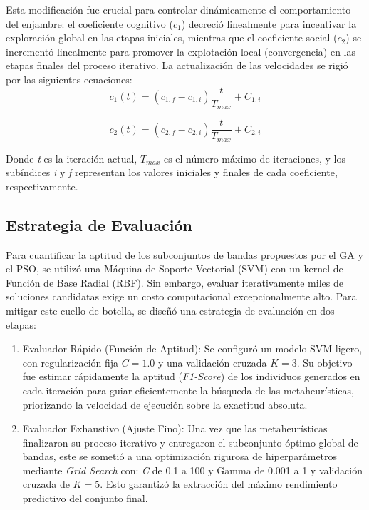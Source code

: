 Esta modificación fue crucial para controlar dinámicamente el comportamiento del enjambre: el coeficiente cognitivo ($c_1$) decreció linealmente para incentivar la exploración global en las etapas iniciales, mientras que el coeficiente social ($c_2$)  se incrementó linealmente para promover la explotación local (convergencia) en las etapas finales del proceso iterativo. La actualización de las velocidades se rigió por las siguientes ecuaciones:
\begin{equation}
    c_1(t)=(c_{1,f}-c_{1,i}) \frac{t}{T_{max}}+C_{1,i}
\end{equation}

\begin{equation}
    c_2(t)=(c_{2,f}-c_{2,i}) \frac{t}{T_{max}}+C_{2,i}
\end{equation}

Donde \textit{t} es la iteración actual, $T_{max}$ es el número máximo de iteraciones, y los subíndices \textit{i} y \textit{f} representan los valores iniciales y finales de cada coeficiente, respectivamente.

\subsection{Estrategia de Evaluación}
Para cuantificar la aptitud de los subconjuntos de bandas propuestos por el GA y el PSO, se utilizó una Máquina de Soporte Vectorial (SVM) con un kernel de Función de Base Radial (RBF). Sin embargo, evaluar iterativamente miles de soluciones candidatas exige un costo computacional excepcionalmente alto. Para mitigar este cuello de botella, se diseñó una estrategia de evaluación en dos etapas:
\begin{enumerate}
    \item Evaluador Rápido (Función de Aptitud): Se configuró un modelo SVM ligero, con regularización fija $C = 1.0$ y una validación cruzada $K = 3$. Su objetivo fue estimar rápidamente la aptitud (\textit{F1-Score}) de los individuos generados en cada iteración para guiar eficientemente la búsqueda de las metaheurísticas, priorizando la velocidad de ejecución sobre la exactitud absoluta.
    \item Evaluador Exhaustivo (Ajuste Fino): Una vez que las metaheurísticas finalizaron su proceso iterativo y entregaron el subconjunto óptimo global de bandas, este se sometió a una optimización rigurosa de hiperparámetros mediante \textit{Grid Search } con: \textit{C} de 0.1 a 100 y Gamma de 0.001 a 1 y validación cruzada de $K=5$. Esto garantizó la extracción del máximo rendimiento predictivo del conjunto final.
\end{enumerate}